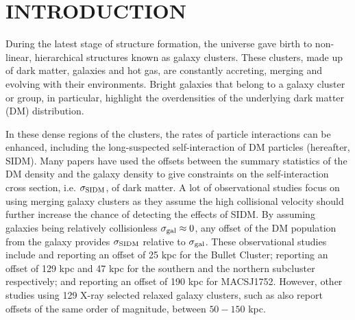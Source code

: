 
\section{INTRODUCTION} 
During the latest stage of structure formation, the universe gave birth to
non-linear, hierarchical structures known as galaxy clusters. 
These clusters, made up of dark matter, galaxies and hot gas,
are constantly accreting, merging and evolving with their
environments. Bright galaxies that belong to a galaxy cluster or group, in 
particular, highlight the overdensities of the underlying dark matter (DM) 
distribution. 


In these dense regions of the clusters, the rates of particle
interactions can be enhanced, including the long-suspected self-interaction of DM
particles (hereafter, SIDM).  
Many papers have used the offsets between the summary statistics of the DM
density and the galaxy density to give constraints on 
the self-interaction cross
section, i.e. $\sigma_{\rm SIDM}$, of dark matter. 
A lot of observational studies focus on using merging galaxy clusters
as they assume the high collisional velocity should further increase the chance
of detecting the effects of SIDM.
By assuming galaxies being relatively collisionless $\sigma_{\rm gal} \approx 0$, 
any offset of the DM population from the galaxy provides $\sigma_{\rm SIDM}$ 
relative to $\sigma_{\rm gal}$. 
These observational studies include \cite{Markevitch2004} and \cite{Bradac2006b}  
reporting an offset of 25 kpc for the Bullet Cluster;  
\cite{Dawson2013} reporting an offset of 129 kpc and 47 kpc for the southern
and the northern subcluster respectively;
and \cite{Jee2015} reporting an offset of 190 kpc for MACSJ1752.
However, other studies using 129 X-ray selected relaxed galaxy clusters, 
such as \cite{George2012a} also report offsets of the same order of magnitude,
between $50 - 150$ kpc. 

